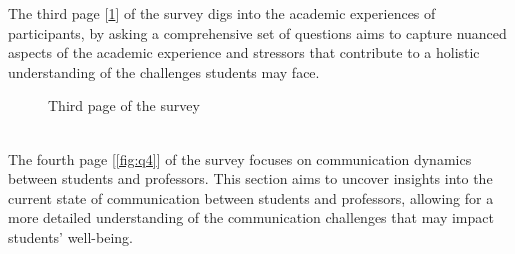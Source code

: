 \documentclass[11pt]{report}
\begin{document}
The third page [\ref{fig:q3}] of the survey digs into the academic experiences of participants, by asking a comprehensive set of questions aims to capture nuanced aspects of the academic experience and stressors that contribute to a holistic understanding of the challenges students may face.
\begin{figure}[h!]
    \centering
    \hfill
    \caption{Third page of the survey}
    \label{fig:q3}
\end{figure}
\\The fourth page [\ref{fig:q4}] of the survey focuses on communication dynamics between students and professors. This section aims to uncover insights into the current state of communication between students and professors, allowing for a more detailed understanding of the communication challenges that may impact students' well-being.
\end{document}
